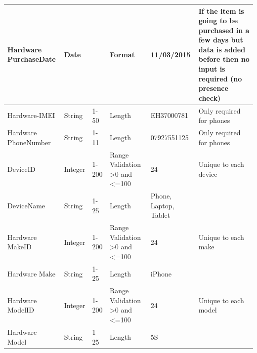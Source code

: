 \begin{center}
\begin{longtable}{|p{2cm}|p{1.14cm}|p{1.1cm}|p{1.7cm}|p{1.7cm}|p{2cm}|}
Hardware PurchaseDate                & Date                                  &                                  & Format                                   & 11/03/2015              & If the item is going to be purchased in a few days but data is added before then no input is required (no presence check)                       \\ \hline
Hardware-IMEI                & String                                  &          1-50                        & Length                                   & EH37000781               & Only required for phones                      \\ \hline
Hardware PhoneNumber                & String                                  &1-11                                  & Length                                   & 07927551125              &   Only required for phones                      \\ \hline
DeviceID                      & Integer                                  & 1-200                                & Range Validation \textgreater0 and \textless=100                                   & 24                 & Unique to each device                       \\ \hline
DeviceName                        & String                                  & 1-25                                 & Length                                   & Phone, Laptop, Tablet                &                       \\ \hline
Hardware MakeID                      & Integer                                  & 1-200                                & Range Validation \textgreater0 and \textless=100                                   & 24                 & Unique to each make                       \\ \hline
Hardware Make                        & String                                  & 1-25                                 & Length                                   & iPhone                &                       \\ \hline
Hardware ModelID		& Integer                                  & 1-200                                & Range Validation \textgreater0 and \textless=100                                   & 24                 & Unique to each model                       \\ \hline
Hardware Model                       & String                                  & 1-25                                 & Length                                   & 5S                    &                       \\ \hline

\end{longtable}
\end{center}

